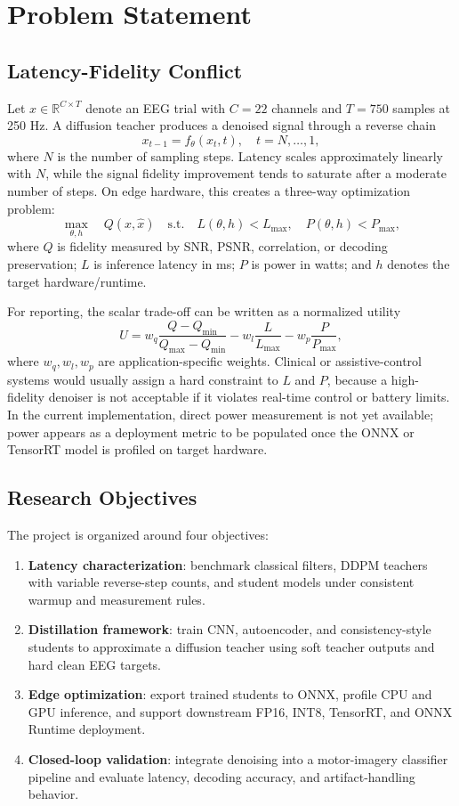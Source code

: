 \documentclass[11pt]{article}
\begin{document}
\section{Problem Statement}

\subsection{Latency-Fidelity Conflict}

Let \(x \in \mathbb{R}^{C \times T}\) denote an EEG trial with \(C=22\) channels and \(T=750\) samples at 250 Hz. A diffusion teacher produces a denoised signal through a reverse chain
\[
x_{t-1}=f_{\theta}(x_t,t), \quad t=N,\ldots,1,
\]
where \(N\) is the number of sampling steps. Latency scales approximately linearly with \(N\), while the signal fidelity improvement tends to saturate after a moderate number of steps. On edge hardware, this creates a three-way optimization problem:
\[
\max_{\theta, h} \quad Q(x,\hat{x}) \quad
\mathrm{s.t.} \quad L(\theta,h) < L_{\max}, \quad P(\theta,h) < P_{\max},
\]
where \(Q\) is fidelity measured by SNR, PSNR, correlation, or decoding preservation; \(L\) is inference latency in ms; \(P\) is power in watts; and \(h\) denotes the target hardware/runtime.

For reporting, the scalar trade-off can be written as a normalized utility
\[
U = w_q \frac{Q-Q_{\min}}{Q_{\max}-Q_{\min}}
- w_l \frac{L}{L_{\max}}
- w_p \frac{P}{P_{\max}},
\]
where \(w_q,w_l,w_p\) are application-specific weights. Clinical or assistive-control systems would usually assign a hard constraint to \(L\) and \(P\), because a high-fidelity denoiser is not acceptable if it violates real-time control or battery limits. In the current implementation, direct power measurement is not yet available; power appears as a deployment metric to be populated once the ONNX or TensorRT model is profiled on target hardware.

\subsection{Research Objectives}

The project is organized around four objectives:

\begin{enumerate}
    \item \textbf{Latency characterization}: benchmark classical filters, DDPM teachers with variable reverse-step counts, and student models under consistent warmup and measurement rules.
    \item \textbf{Distillation framework}: train CNN, autoencoder, and consistency-style students to approximate a diffusion teacher using soft teacher outputs and hard clean EEG targets.
    \item \textbf{Edge optimization}: export trained students to ONNX, profile CPU and GPU inference, and support downstream FP16, INT8, TensorRT, and ONNX Runtime deployment.
    \item \textbf{Closed-loop validation}: integrate denoising into a motor-imagery classifier pipeline and evaluate latency, decoding accuracy, and artifact-handling behavior.
\end{enumerate}
\end{document}
